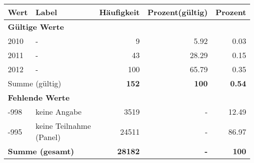      \begin{longtable}{lXrrr}
     \toprule
     \textbf{Wert} & \textbf{Label} & \textbf{Häufigkeit} & \textbf{Prozent(gültig)} & \textbf{Prozent} \\
     \endhead
     \midrule
     \multicolumn{5}{l}{\textbf{Gültige Werte}}\\

     2010 &
     \multicolumn{1}{X}{ -  } &


       \num{9} &
       \num[round-mode=places,round-precision=2]{5.92} &
         \num[round-mode=places,round-precision=2]{0.03} \\

     2011 &
     \multicolumn{1}{X}{ -  } &


       \num{43} &
       \num[round-mode=places,round-precision=2]{28.29} &
         \num[round-mode=places,round-precision=2]{0.15} \\

     2012 &
     \multicolumn{1}{X}{ -  } &


       \num{100} &
       \num[round-mode=places,round-precision=2]{65.79} &
         \num[round-mode=places,round-precision=2]{0.35} \\
     \midrule
     \multicolumn{2}{l}{Summe (gültig)} &
       \textbf{\num{152}} &
     \textbf{100} &
       \textbf{\num[round-mode=places,round-precision=2]{0.54}} \\
     \multicolumn{5}{l}{\textbf{Fehlende Werte}}\\
       -998 &
       keine Angabe &
         \num{3519} &
        - &
         \num[round-mode=places,round-precision=2]{12.49} \\
       -995 &
       keine Teilnahme (Panel) &
         \num{24511} &
        - &
         \num[round-mode=places,round-precision=2]{86.97} \\
     \midrule
     \multicolumn{2}{l}{\textbf{Summe (gesamt)}} &
          \textbf{\num{28182}} &
        \textbf{-} &
        \textbf{100} \\
     \bottomrule
     \end{longtable}
     
